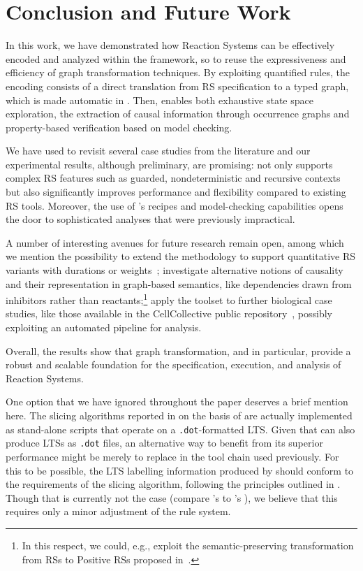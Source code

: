 
\section{Conclusion and Future Work}\label{sec:conc}

In this work, we have demonstrated how Reaction Systems can be effectively encoded and analyzed within the \GROOVE framework, so to reuse the expressiveness and efficiency of graph transformation techniques. By exploiting quantified rules, the encoding consists of a direct translation from RS specification to a typed graph, which is made automatic in \BioResolve.
Then, \GROOVE enables both exhaustive state space exploration, the extraction of causal information through occurrence graphs and property-based verification based on model checking.

We have used \GROOVE to revisit several case studies from the literature and our experimental results, although preliminary, are promising: \GROOVE not only supports complex RS features such as guarded, nondeterministic and recursive contexts but also significantly improves performance and flexibility compared to existing RS tools.
Moreover, the use of \GROOVE’s recipes and model-checking capabilities opens the door to sophisticated analyses that were previously impractical.

A number of interesting avenues for future research remain open, among which we mention the possibility to extend the methodology to support quantitative RS variants with durations or weights~\cite{DBLP:journals/nca/BrodoBFGLM23}; investigate alternative notions of causality and their representation in graph-based semantics, like dependencies drawn from inhibitors rather than reactants;\footnote{In this respect, we could, e.g., exploit the semantic-preserving transformation from RSs to Positive RSs proposed in~\cite{DBLP:journals/sttt/BrodoBFGMMP24}.} apply the \GROOVE toolset to further biological case studies, like those available in the CellCollective public repository~\cite{helikar2012cell}, possibly exploiting an automated pipeline for analysis.

Overall, the results show that graph transformation, and \GROOVE in particular, provide a robust and scalable foundation for the specification, execution, and analysis of Reaction Systems.

\medskip\noindent One option that we have ignored throughout the paper deserves a brief mention here. The slicing algorithms reported in \cite{DBLP:conf/cmsb/BowlesBBFGM24,datamod2023} on the basis of \BioResolve are actually implemented as stand-alone scripts that operate on a \texttt{.dot}-formatted LTS. Given that \GROOVE can also produce LTSs as \texttt{.dot} files, an alternative way to benefit from its superior performance might be merely to replace \BioResolve in the tool chain used previously. For this to be possible, the LTS labelling information produced by \GROOVE should conform to the requirements of the slicing algorithm, following the principles outlined in . Though that is currently not the case (compare \GROOVE's  to \BioResolve's ), we believe that this requires only a minor adjustment of the rule system.

